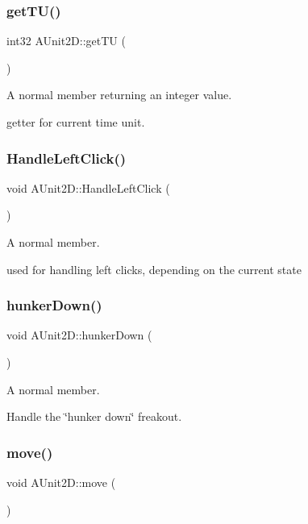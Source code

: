 \subsubsection{\texorpdfstring{get\+T\+U()}{getTU()}}
{\footnotesize\ttfamily int32 A\+Unit2\+D\+::get\+TU (\begin{DoxyParamCaption}{ }\end{DoxyParamCaption})}



A normal member returning an integer value. 

getter for current time unit. \hypertarget{class_a_unit2_d_a6a1a7ef96c7efebf5a7f50b011b7a6c0}{}\label{class_a_unit2_d_a6a1a7ef96c7efebf5a7f50b011b7a6c0} 
\subsubsection{\texorpdfstring{Handle\+Left\+Click()}{HandleLeftClick()}}
{\footnotesize\ttfamily void A\+Unit2\+D\+::\+Handle\+Left\+Click (\begin{DoxyParamCaption}{ }\end{DoxyParamCaption})}



A normal member. 

used for handling left clicks, depending on the current state \hypertarget{class_a_unit2_d_ae1e36f7fa10bf392c4ceb150fd6addc8}{}\label{class_a_unit2_d_ae1e36f7fa10bf392c4ceb150fd6addc8} 
\subsubsection{\texorpdfstring{hunker\+Down()}{hunkerDown()}}
{\footnotesize\ttfamily void A\+Unit2\+D\+::hunker\+Down (\begin{DoxyParamCaption}{ }\end{DoxyParamCaption})}



A normal member. 

Handle the \char`\"{}hunker down\char`\"{} freakout. \hypertarget{class_a_unit2_d_a8567eec6dc49533041735e125cace6e2}{}\label{class_a_unit2_d_a8567eec6dc49533041735e125cace6e2} 
\subsubsection{\texorpdfstring{move()}{move()}}
{\footnotesize\ttfamily void A\+Unit2\+D\+::move (\begin{DoxyParamCaption}{ }\end{DoxyParamCaption})}



